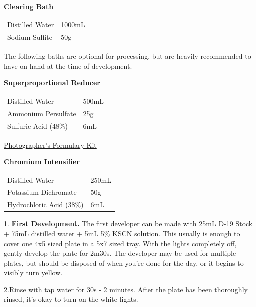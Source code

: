 \documentclass[11pt]{article}
\begin{document}
\textbf{Clearing Bath}\newline

\begin{tabular}{ll}
	Distilled Water & 1000mL \\
	Sodium Sulfite & 50g \\
\end{tabular}\newline

The following baths are optional for processing, but are heavily recommended to have on hand at the time of development.\newline

\textbf{Superproportional Reducer}\newline

\begin{tabular}{ll}
	Distilled Water & 500mL \\
	Ammonium Persulfate & 25g \\
	Sulfuric Acid (48\%) & 6mL \\
\end{tabular}\newline

\href{http://stores.photoformulary.com/reducer-ii-for-negatives-ground-ups-only/}{Photographer's Formulary Kit}\newline

\textbf{Chromium Intensifier}\newline

\begin{tabular}{ll}
	Distilled Water & 250mL \\
	Potassium Dichromate & 50g \\
	Hydrochloric Acid (38\%) & 6mL \\
\end{tabular}\newline

1. \textbf{First Development.} The first developer can be made with 25mL D-19 Stock + 75mL distilled water + 5mL 5\% KSCN solution. This usually is enough to cover one 4x5 sized plate in a 5x7 sized tray. With the lights completely off, gently develop the plate for 2m30s. The developer may be used for multiple plates, but should be disposed of when you're done for the day, or it begins to visibly turn yellow.\newline

2.Rinse with tap water for 30s - 2 minutes. After the plate has been thoroughly rinsed, it's okay to turn on the white lights.\newline
\end{document}
